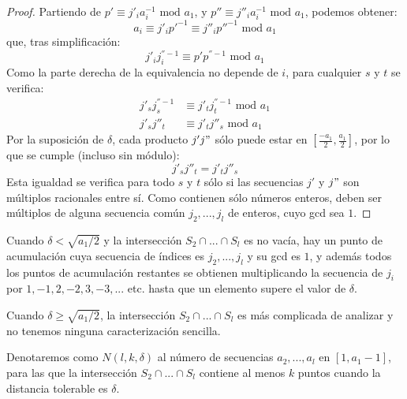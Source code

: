     \begin{proof}
        Partiendo de $p' \equiv j'_{i}a_{i}^{-1} \text{ mod } a_{1}$, y $p'' \equiv j''_{i}a_{i}^{-1} \text{ mod } a_{1}$, podemos obtener:
        \begin{equation}
            a_{i} \equiv j'_{i}p'^{-1} \equiv j''_{i}p''^{-1} \text{ mod } a_{1}
        \end{equation}
        que, tras simplificación:
        \begin{equation}
            j'_{i}j_{i}^{''-1} \equiv p'p^{''-1} \text{ mod } a_{1}
        \end{equation}
        Como la parte derecha de la equivalencia no depende de $i$, para cualquier $s$ y $t$ se verifica:
        \begin{align}
            j'_{s}j_{s}^{''-1} &\equiv j'_{t}j_{t}^{''-1} \text{ mod } a_{1} \\
            j'_{s}j''_{t} &\equiv j'_{t}j''_{s} \text{ mod } a_{1}
        \end{align}
        Por la suposición de $\delta$, cada producto $j'j"$ sólo puede estar en $[\frac{-a_{1}}{2}, \frac{a_{1}}{2}]$, por lo que se cumple (incluso sin módulo):
        \begin{equation}
            j'_{s}j''_{t} = j'_{t}j''_{s}
        \end{equation}
        Esta igualdad se verifica para todo $s$ y $t$ sólo si las secuencias $j'$ y $j"$ son múltiplos racionales entre sí. Como contienen sólo números enteros, deben ser múltiplos de alguna secuencia común $j_{2}, ... , j_{l}$ de enteros, cuyo gcd sea $1$.
    \end{proof}

    \begin{corolario}
        Cuando $\delta < \sqrt{a_{1}/2}$ y la intersección $S_{2} \cap ... \cap S_{l}$ es no vacía, hay un punto de acumulación cuya secuencia de índices es $j_{2}, ... , j_{l}$ y su gcd es $1$, y además todos los puntos de acumulación restantes se obtienen multiplicando la secuencia de $j_{i}$ por $1, -1, 2, -2, 3, -3, ...$ etc. hasta que un elemento supere el valor de $\delta$.

        Cuando $\delta \geq \sqrt{a_{1}/2}$, la intersección $S_{2} \cap ... \cap S_{l}$ es más complicada de analizar y no tenemos ninguna caracterización sencilla.
    \end{corolario}

    \begin{definicion} \cite{artSha}
        Denotaremos como $N(l, k, \delta)$ al número de secuencias $a_{2}, ... , a_{l}$ en $[1, a_{1} - 1]$, para las que la intersección $S_{2} \cap ... \cap S_{l}$ contiene al menos $k$ puntos cuando la distancia tolerable es $\delta$.
    \end{definicion}

